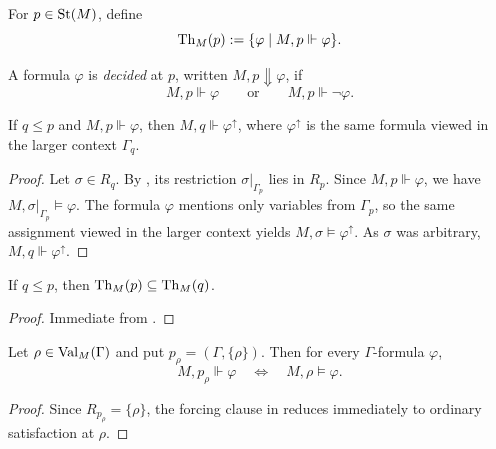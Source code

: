 \begin{definition}\label{def:state-theory}
For $p\in\mathrm{St}(M)$, define
\[
\mathrm{Th}_M(p):=\{\varphi\mid M,p\Vdash\varphi\}.
\]
\end{definition}

\begin{definition}[Decidedness]\label{def:decidedness}
A formula $\varphi$ is \emph{decided} at $p$, written $M,p\Downarrow\varphi$, if
\[
M,p\Vdash\varphi
\qquad\text{or}\qquad
M,p\Vdash\neg\varphi.
\]
\end{definition}

\begin{proposition}\label{prop:forcing-persistence}
If $q\le p$ and $M,p\Vdash\varphi$, then $M,q\Vdash\varphi^\uparrow$, where $\varphi^\uparrow$ is the same formula viewed in the larger context $\Gamma_q$.
\end{proposition}

\begin{proof}
Let $\sigma\in R_q$. By , its restriction $\sigma|_{\Gamma_p}$ lies in $R_p$. Since $M,p\Vdash\varphi$, we have $M,\sigma|_{\Gamma_p}\models\varphi$. The formula $\varphi$ mentions only variables from $\Gamma_p$, so the same assignment viewed in the larger context yields $M,\sigma\models\varphi^\uparrow$. As $\sigma$ was arbitrary, $M,q\Vdash\varphi^\uparrow$.
\end{proof}

\begin{corollary}\label{cor:state-theory-monotonicity}
If $q\le p$, then $\mathrm{Th}_M(p)\subseteq \mathrm{Th}_M(q)$.
\end{corollary}

\begin{proof}
Immediate from .
\end{proof}

\begin{proposition}\label{prop:singleton-conservativity}
Let $\rho\in\mathrm{Val}_M(\Gamma)$ and put $p_\rho=(\Gamma,\{\rho\})$. Then for every $\Gamma$-formula $\varphi$,
\[
M,p_\rho\Vdash\varphi
\quad\Longleftrightarrow\quad
M,\rho\models\varphi.
\]
\end{proposition}

\begin{proof}
Since $R_{p_\rho}=\{\rho\}$, the forcing clause in  reduces immediately to ordinary satisfaction at $\rho$.
\end{proof}

